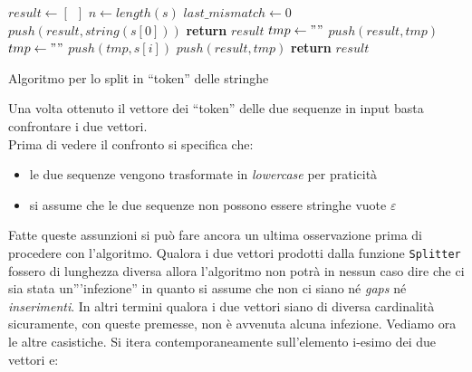 \documentclass[a4paper,12pt, oneside]{book}
\begin{document}
\begin{algorithm}[H]
  \begin{algorithmic}
    \State $result \gets \left[\,\,\,\right]$
    \State $n\gets length(s)$
    \State $last\_mismatch \gets 0$
    \State $push(result, string(s[0]))$
    \State \textbf{return} $result$
    \EndIf
    \State $tmp \gets ""$
    \State $push(result, tmp)$
    \State $tmp \gets ""$
    \EndIf
    \State $push(tmp, s[i])$
    \State $push(result, tmp)$
    \EndIf
    \EndFor
    \State \textbf{return} $result$
    \EndFunction
  \end{algorithmic}
  \caption{Algoritmo per lo split in ``token'' delle stringhe}
\end{algorithm}
Una volta ottenuto il vettore dei ``token'' delle due sequenze in input basta
confrontare i due vettori.\\
Prima di vedere il confronto si specifica che:
\begin{itemize}
  \item le due sequenze vengono trasformate in \textit{lowercase} per praticità
  \item si assume che le due sequenze non possono essere stringhe vuote
  $\varepsilon$ 
\end{itemize}
Fatte queste assunzioni si può fare ancora un ultima osservazione prima di
procedere con l'algoritmo. Qualora i due vettori prodotti dalla funzione
\texttt{Splitter} fossero di lunghezza diversa allora l'algoritmo non potrà in
nessun caso dire che ci sia stata un'''infezione'' in quanto si assume che non
ci siano né \textit{gaps} né \textit{inserimenti}. In altri termini qualora i
due vettori siano di diversa cardinalità sicuramente, con queste premesse, non è
avvenuta alcuna infezione. Vediamo ora le altre casistiche. Si itera
contemporaneamente sull'elemento i-esimo dei due vettori e:
\end{document}
